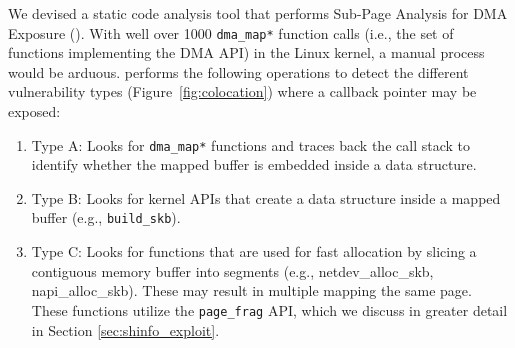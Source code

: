 We devised a static code analysis tool that performs Sub-Page Analysis for DMA Exposure (\tool). With well over 1000 \texttt{dma\_map*} function calls (i.e., the set of functions implementing the DMA API) in the Linux kernel, a manual process would be arduous. \tool performs the following operations to detect the different \subpage{} vulnerability types (Figure~\ref{fig:colocation}) where a callback pointer may be exposed:
\begin{enumerate}
    \item Type A: Looks for \texttt{dma\_map*} functions and traces back the call stack to identify whether the mapped buffer is embedded inside a data structure.
    \item Type B: Looks for kernel APIs that create a data structure inside a mapped buffer (e.g., \texttt{build\_skb}).
    \item Type C: Looks for functions that are used for fast allocation by slicing a contiguous memory buffer into segments (e.g., netdev\_alloc\_skb, napi\_alloc\_skb). These may result in multiple \iova mapping the same page. These functions utilize the \texttt{page\_frag} API, which we discuss in greater detail in Section \ref{sec:shinfo_exploit}. 
\end{enumerate}




